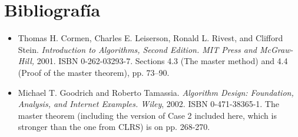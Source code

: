 \documentclass[12pt, letterpaper]{article} %
\begin{document}
    \section{Bibliografía} 

\begin{itemize}
    \item Thomas H. Cormen, Charles E. Leiserson, Ronald L. Rivest, and Clifford Stein. \textit{Introduction to Algorithms, Second Edition. MIT Press and McGraw-Hill,} 2001. ISBN 0-262-03293-7. Sections 4.3 (The master method) and 4.4 (Proof of the master theorem), pp. 73–90.
    \item Michael T. Goodrich and Roberto Tamassia. \textit{ Algorithm Design: Foundation, Analysis, and Internet Examples. Wiley}, 2002. ISBN 0-471-38365-1. The master theorem (including the version of Case 2 included here, which is stronger than the one from CLRS) is on pp. 268-270.
  \end{itemize}

    
    
     
  
\end{document}
